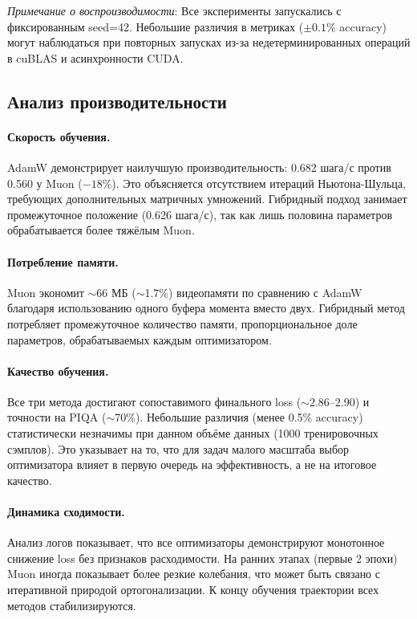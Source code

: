 \documentclass[a4paper,12pt]{article}
\begin{document}
\noindent\textit{Примечание о воспроизводимости}: Все эксперименты запускались с фиксированным seed=42. Небольшие различия в метриках ($\pm 0.1\%$ accuracy) могут наблюдаться при повторных запусках из-за недетерминированных операций в cuBLAS и асинхронности CUDA.

\subsection{Анализ производительности}

\paragraph{Скорость обучения.}
AdamW демонстрирует наилучшую производительность: 0.682 шага/с против 0.560 у Muon ($-18\%$). Это объясняется отсутствием итераций Ньютона-Шульца, требующих дополнительных матричных умножений. Гибридный подход занимает промежуточное положение (0.626 шага/с), так как лишь половина параметров обрабатывается более тяжёлым Muon.

\paragraph{Потребление памяти.}
Muon экономит $\sim$66 МБ ($\sim$1.7\%) видеопамяти по сравнению с AdamW благодаря использованию одного буфера момента вместо двух. Гибридный метод потребляет промежуточное количество памяти, пропорциональное доле параметров, обрабатываемых каждым оптимизатором.

\paragraph{Качество обучения.}
Все три метода достигают сопоставимого финального loss ($\sim$2.86--2.90) и точности на PIQA ($\sim$70\%). Небольшие различия (менее 0.5\% accuracy) статистически незначимы при данном объёме данных (1000 тренировочных сэмплов). Это указывает на то, что для задач малого масштаба выбор оптимизатора влияет в первую очередь на эффективность, а не на итоговое качество.

\paragraph{Динамика сходимости.}
Анализ логов показывает, что все оптимизаторы демонстрируют монотонное снижение loss без признаков расходимости. На ранних этапах (первые 2 эпохи) Muon иногда показывает более резкие колебания, что может быть связано с итеративной природой ортогонализации. К концу обучения траектории всех методов стабилизируются.
\newpage
\end{document}
